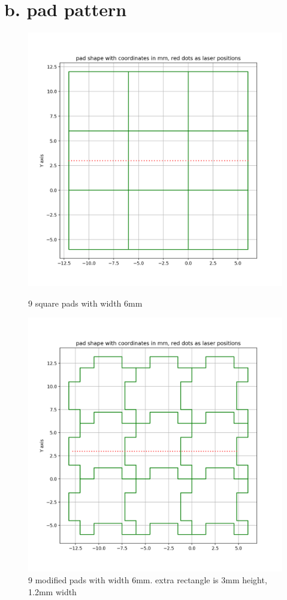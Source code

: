 \documentclass{article}
\begin{document}
\section{b. pad pattern}
\begin{figure}
  \centering
  \begin{minipage}[b]{0.4\textwidth}
    \includegraphics[width=\textwidth]{fig2_a rpad.png}
    \caption{9 square pads with width 6mm}
  \end{minipage}
  \hfill
  \begin{minipage}[b]{0.4\textwidth}
    \includegraphics[width=\textwidth]{fig2_b.png}
    \caption{9 modified pads with width 6mm. extra rectangle is 3mm height, 1.2mm width}
  \end{minipage}
\end{figure}
\end{document}
